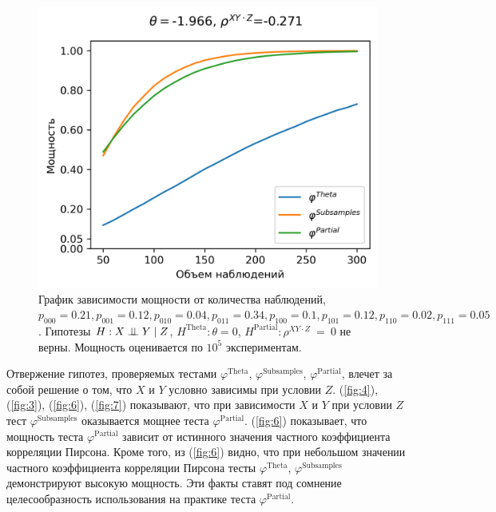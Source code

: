 \begin{figure}[H]
    \centering
    \includegraphics[scale=0.65]{images/graph7.png}
    \caption{График зависимости мощности от количества наблюдений,
    $p_{000}=0.21, p_{001}=0.12, 
    p_{010}=0.04, p_{011}=0.34,
    p_{100}=0.1, p_{101}=0.12, p_{110}=0.02, p_{111}=0.05$. 
    Гипотезы $H: X \perp\!\!\!\perp Y \mid Z$,
    $H^{\text{Theta}}: \theta=0$, 
    $H^{\text{Partial}}: \rho^{XY\cdot Z}~=~0$
    не верны.
    Мощность оценивается по $10^5$ экспериментам.} \label{fig:7}
\end{figure}

Отвержение гипотез, проверяемых  тестами 
$\varphi^{\text{Theta}}$,
$\varphi^{\text{Subsamples}}$,
$\varphi^{\text{Partial}}$, влечет за собой решение о том, что
$X$ и $Y$ условно зависимы при условии $Z$.
(\autoref{fig:4}), 
(\autoref{fig:3}), (\autoref{fig:6}), (\autoref{fig:7})
показывают, что при зависимости 
$X$ и $Y$ при условии $Z$ тест $\varphi^{\text{Subsamples}}$
оказывается мощнее теста $\varphi^{\text{Partial}}$.
(\autoref{fig:6}) показывает, что
мощность теста $\varphi^{\text{Partial}}$ зависит от истинного
значения частного коэффициента корреляции Пирсона. Кроме того, из (\autoref{fig:6})
видно, что при небольшом значении частного коэффициента корреляции
Пирсона тесты $\varphi^{\text{Theta}}$,
$\varphi^{\text{Subsamples}}$ демонстрируют высокую мощность.
Эти факты ставят под сомнение целесообразность использования 
на практике теста $\varphi^{\text{Partial}}$.

